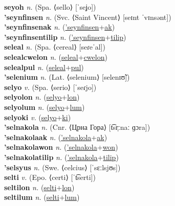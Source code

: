 \textbf{seyoh} \textit{n.} (Spa. ⟨sello⟩ [ˈseʝo])
 \label{seyoh} \\
\textbf{'seynfinsen} \textit{n.} (Svc. ⟨Saint Vincent⟩ [seɪnt ˈvɪnsənt])
 \label{'seynfinsen} \\
\textbf{'seynfinsenak} \textit{n.} (\hyperref['seynfinsen]{'seynfinsen}+\hyperref[ak]{ak})
 \label{'seynfinsenak} \\
\textbf{'seynfinsentilip} \textit{n.} (\hyperref['seynfinsen]{'seynfinsen}+\hyperref[tilip]{tilip})
 \label{'seynfinsentilip} \\
\textbf{seleal} \textit{n.} (Spa. ⟨cereal⟩ [seɾeˈal])
 \label{seleal} \\
\textbf{selealcwelon} \textit{n.} (\hyperref[seleal]{seleal}+\hyperref[cwelon]{cwelon})
 \label{selealcwelon} \\
\textbf{selealpul} \textit{n.} (\hyperref[seleal]{seleal}+\hyperref[pul]{pul})
 \label{selealpul} \\
\textbf{'selenium} \textit{n.} (Lat. ⟨selenium⟩ [selenɪʊ̃])
 \label{'selenium} \\
\textbf{selyo} \textit{v.} (Spa. ⟨serio⟩ [ˈseɾjo])
 \label{selyo} \\
\textbf{selyolon} \textit{n.} (\hyperref[selyo]{selyo}+\hyperref[lon]{lon})
 \label{selyolon} \\
\textbf{selyolum} \textit{n.} (\hyperref[selyo]{selyo}+\hyperref[lum]{lum})
 \label{selyolum} \\
\textbf{selyoki} \textit{v.} (\hyperref[selyo]{selyo}+\hyperref[ki]{ki})
 \label{selyoki} \\
\textbf{'selnakola} \textit{n.} (Cnr. ⟨Црна Гора⟩ [t͡sr̩ːnaː ɡɔra])
 \label{'selnakola} \\
\textbf{'selnakolaak} \textit{n.} (\hyperref['selnakola]{'selnakola}+\hyperref[ak]{ak})
 \label{'selnakolaak} \\
\textbf{'selnakolawon} \textit{n.} (\hyperref['selnakola]{'selnakola}+\hyperref[won]{won})
 \label{'selnakolawon} \\
\textbf{'selnakolatilip} \textit{n.} (\hyperref['selnakola]{'selnakola}+\hyperref[tilip]{tilip})
 \label{'selnakolatilip} \\
\textbf{'selsyus} \textit{n.} (Swe. ⟨celcius⟩ [ˈsɛːlsjʊs])
 \label{'selsyus} \\
\textbf{selti} \textit{v.} (Epo. ⟨certi⟩ [ˈt͡serti])
 \label{selti} \\
\textbf{seltilon} \textit{n.} (\hyperref[selti]{selti}+\hyperref[lon]{lon})
 \label{seltilon} \\
\textbf{seltilum} \textit{n.} (\hyperref[selti]{selti}+\hyperref[lum]{lum})
